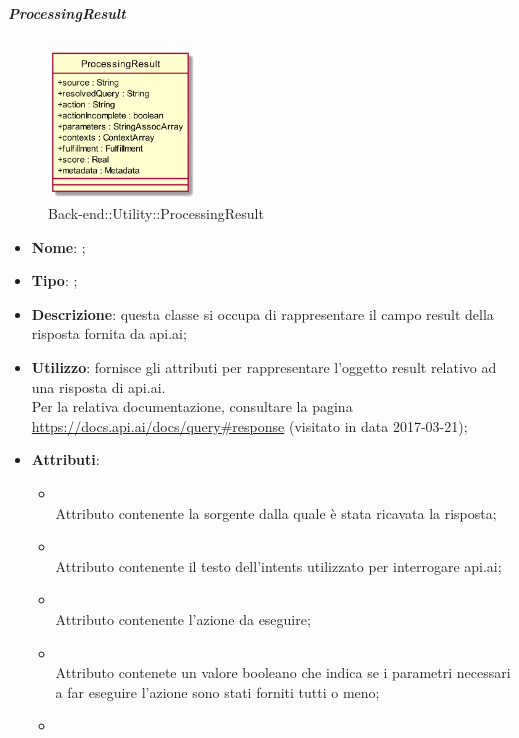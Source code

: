 \hypertarget{ProcessingResult_label}{\subparagraph{ProcessingResult}}
\begin{figure}[h]
	\centering
	\includegraphics[width=0.35\textwidth,height=\textheight,keepaspectratio]{images/ClassProcessingResult.png}
	\caption{Back-end::Utility::ProcessingResult}
\end{figure}
\begin{itemize}
	\item \textbf{Nome}: ;
	\item \textbf{Tipo}: ;
	\item \textbf{Descrizione}: questa classe si occupa di rappresentare il campo result della risposta fornita da api.ai;
	\item \textbf{Utilizzo}: fornisce gli attributi per rappresentare l'oggetto result relativo ad una risposta di api.ai. \\
	Per la relativa documentazione, consultare la pagina \url{https://docs.api.ai/docs/query#response} (visitato in data 2017-03-21);
	\item \textbf{Attributi}:
	\begin{itemize}
		\item[]  \\
		Attributo contenente la sorgente dalla quale è stata ricavata la risposta;
		\item[]  \\
		Attributo contenente il testo dell'intents utilizzato per interrogare api.ai;
		\item[]  \\
		Attributo contenente l'azione da eseguire;
		\item[]  \\
		Attributo contenete un valore booleano che indica se i parametri necessari a far eseguire l'azione sono stati forniti tutti o meno;
		\item[]  \\

\end{itemize}
\end{itemize}

